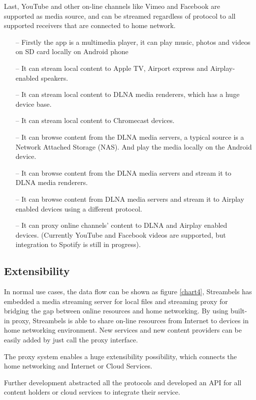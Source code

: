 Last, YouTube and other on-line channels like Vimeo and Facebook are supported
as media source, and can be streamed regardless of protocol to all supported
receivers that are connected to home network.


\begin{itemize}
\item[--]Firstly the app is a multimedia player, it can play music, photos and videos 
on SD card locally on Android phone
\item[--]It can stream local content to Apple TV, Airport express and Airplay-enabled 
speakers.
\item[--]It can stream local content to DLNA media renderers, which has a huge device 
base.
\item[--]It can stream local content to Chromecast devices.
\item[--]It can browse content from the DLNA media servers, a typical source is a 
Network Attached Storage (NAS). And play the media locally on the Android device.
\item[--]It can browse content from the DLNA media servers and stream it to DLNA media 
renderers.
\item[--]It can browse content from DLNA media servers and stream it to Airplay enabled 
devices using a different protocol.
\item[--]It can proxy online channels' content to DLNA and Airplay enabled devices. 
(Currently YouTube and Facebook videos are supported, but integration to Spotify is still 
in progress).
\end{itemize}

\subsection{Extensibility}
In normal use cases, the data flow can be shown as figure \ref{chart4},
Streambels has embedded a media streaming server for local files and streaming
proxy for bridging the gap between online resources and home networking. By
using built-in proxy, Streambels is able to share on-line resources from
Internet to devices in home networking environment. New services and new
content providers can be easily added by just call the proxy interface.

The proxy system enables a huge extensibility possibility, which connects the
home networking and Internet or Cloud Services.

Further development abstracted all the protocols and developed an API for all
content holders or cloud services to integrate their service.

